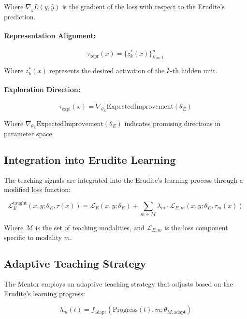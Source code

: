 Where $\nabla_{\hat{y}} L(y, \hat{y})$ is the gradient of the loss with respect to the Erudite's prediction.

\paragraph{Representation Alignment:}
\begin{equation}
\tau_{\text{repr}}(x) = \{z_k^*(x)\}_{k=1}^p
\end{equation}

Where $z_k^*(x)$ represents the desired activation of the $k$-th hidden unit.

\paragraph{Exploration Direction:}
\begin{equation}
\tau_{\text{expl}}(x) = \nabla_{\theta_E} \text{ExpectedImprovement}(\theta_E)
\end{equation}

Where $\nabla_{\theta_E} \text{ExpectedImprovement}(\theta_E)$ indicates promising directions in parameter space.

\subsection{Integration into Erudite Learning}

The teaching signals are integrated into the Erudite's learning process through a modified loss function:

\begin{equation}
\mathcal{L}_{E}^{\text{taught}}(x, y; \theta_E, \tau(x)) = \mathcal{L}_E(x, y; \theta_E) + \sum_{m \in \mathcal{M}} \lambda_m \cdot \mathcal{L}_{E,m}(x, y; \theta_E, \tau_m(x))
\end{equation}

Where $\mathcal{M}$ is the set of teaching modalities, and $\mathcal{L}_{E,m}$ is the loss component specific to modality $m$.

\subsection{Adaptive Teaching Strategy}

The Mentor employs an adaptive teaching strategy that adjusts based on the Erudite's learning progress:

\begin{equation}
\lambda_m(t) = f_{\text{adapt}}(\text{Progress}(t), m; \theta_{M,\text{adapt}})
\end{equation}

